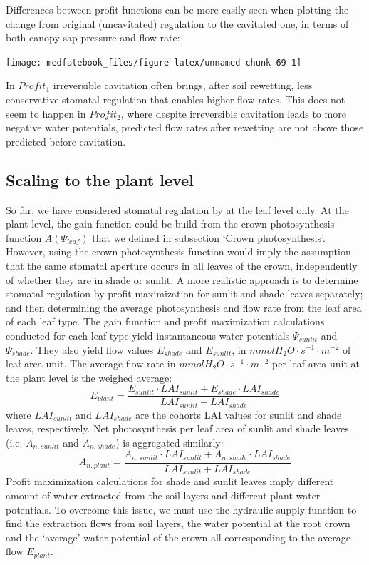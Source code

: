 \documentclass[]{book}
\begin{document}
Differences between profit functions can be more easily seen when plotting the change from original (uncavitated) regulation to the cavitated one, in terms of both canopy sap pressure and flow rate:

\begin{center}\texttt{[image: medfatebook\_files/figure-latex/unnamed-chunk-69-1]} \end{center}

In \(Profit_1\) irreversible cavitation often brings, after soil rewetting, less conservative stomatal regulation that enables higher flow rates. This does not seem to happen in \(Profit_2\), where despite irreversible cavitation leads to more negative water potentials, predicted flow rates after rewetting are not above those predicted before cavitation.

\hypertarget{scaling-to-the-plant-level}{%
\subsection{Scaling to the plant level}\label{scaling-to-the-plant-level}}

So far, we have considered stomatal regulation by at the leaf level only. At the plant level, the gain function could be build from the crown photosynthesis function \(A(\Psi_{leaf})\) that we defined in subsection `Crown photosynthesis'. However, using the crown photosynthesis function would imply the assumption that the same stomatal aperture occurs in all leaves of the crown, independently of whether they are in shade or sunlit. A more realistic approach is to determine stomatal regulation by profit maximization for sunlit and shade leaves separately; and then determining the average photosynthesis and flow rate from the leaf area of each leaf type. The gain function and profit maximization calculations conducted for each leaf type yield instantaneous water potentials \(\Psi_{sunlit}\) and \(\Psi_{shade}\). They also yield flow values \(E_{shade}\) and \(E_{sunlit}\), in \(mmol H_2O \cdot s^{-1} \cdot m^{-2}\) of leaf area unit. The average flow rate in \(mmol H_2O \cdot s^{-1} \cdot m^{-2}\) per leaf area unit at the plant level is the weighed average:
\begin{equation}
 E_{plant} = \frac{E_{sunlit} \cdot LAI_{sunlit} + E_{shade} \cdot LAI_{shade}}{LAI_{sunlit} + LAI_{shade}}
\end{equation}
where \(LAI_{sunlit}\) and \(LAI_{shade}\) are the cohorts LAI values for sunlit and shade leaves, respectively. Net photosynthesis per leaf area of sunlit and shade leaves (i.e. \(A_{n,sunlit}\) and \(A_{n,shade}\)) is aggregated similarly:
\begin{equation}
 A_{n, plant} = \frac{A_{n,sunlit} \cdot LAI_{sunlit} + A_{n,shade} \cdot LAI_{shade}}{LAI_{sunlit} + LAI_{shade}}
\end{equation}
Profit maximization calculations for shade and sunlit leaves imply different amount of water extracted from the soil layers and different plant water potentials. To overcome this issue, we must use the hydraulic supply function to find the extraction flows from soil layers, the water potential at the root crown and the `average' water potential of the crown all corresponding to the average flow \(E_{plant}\).
\end{document}
